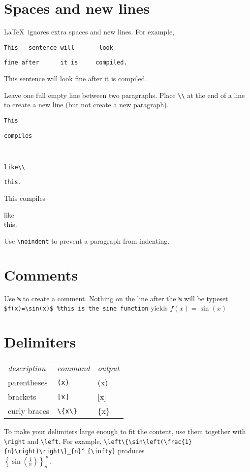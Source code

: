 \begin{multicols}{3}
\section{Spaces and new lines}

\LaTeX\ ignores extra spaces and new lines. For example, 

\verb!This   sentence will       look!

\verb!fine after      it is     compiled.!

This   sentence will       look
fine after      it is     compiled.


Leave one full empty line between two paragraphs. Place \verb!\\! at the end of a line to create a new line (but not create a new paragraph).

\verb!This!

\verb!compiles!

~

\verb!like\\!

\verb!this.!

This
compiles 

like\\
this.

Use  \verb!\noindent! to prevent a paragraph from indenting.

\section{Comments}

Use \verb!%! to create a comment. Nothing on the line after the \verb!%! will be typeset. \verb!$f(x)=\sin(x)$ %this is the sine function! yields $f(x)=\sin(x)$%

\section{Delimiters}

\begin{tabular}{lll}
\emph{description} & \emph{command} & \emph{output}\\
parentheses &\verb!(x)! & (x)\\
brackets &\verb![x]! & [x]\\
curly braces& \verb!\{x\}! & \{x\}\\
\end{tabular}

To make your delimiters large enough to fit the content, use them together with \verb!\right! and \verb!\left!. For example, \verb!\left\{\sin\left(\frac{1}{n}\right)\right\}_{n}^! \verb!{\infty}! produces\\ $\displaystyle \left\{\sin\left(\frac{1}{n}\right)\right\}_{n}^{\infty}$.


\end{multicols}
